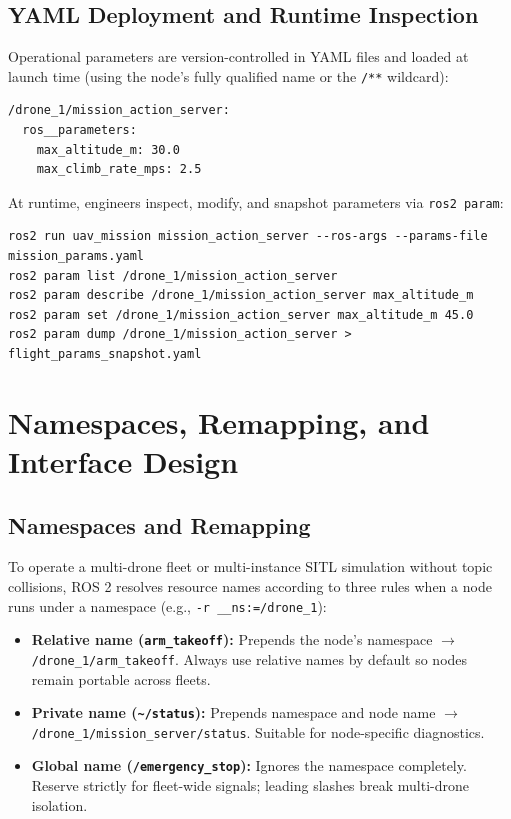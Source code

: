 \documentclass{article}
\begin{document}
\subsection{YAML Deployment and Runtime Inspection}
Operational parameters are version-controlled in YAML files and loaded at launch time (using the node's fully qualified name or the \texttt{/**} wildcard):

\begin{verbatim}
/drone_1/mission_action_server:
  ros__parameters:
    max_altitude_m: 30.0
    max_climb_rate_mps: 2.5
\end{verbatim}

At runtime, engineers inspect, modify, and snapshot parameters via \texttt{ros2 param}:
\begin{verbatim}
ros2 run uav_mission mission_action_server --ros-args --params-file mission_params.yaml
ros2 param list /drone_1/mission_action_server
ros2 param describe /drone_1/mission_action_server max_altitude_m
ros2 param set /drone_1/mission_action_server max_altitude_m 45.0
ros2 param dump /drone_1/mission_action_server > flight_params_snapshot.yaml
\end{verbatim}

\section{Namespaces, Remapping, and Interface Design}

\subsection{Namespaces and Remapping}
To operate a multi-drone fleet or multi-instance SITL simulation without topic collisions, ROS 2 resolves resource names according to three rules when a node runs under a namespace (e.g., \texttt{-r \_\_ns:=/drone\_1}):
\begin{itemize}
    \item \textbf{Relative name (\texttt{arm\_takeoff}):} Prepends the node's namespace $\rightarrow$ \texttt{/drone\_1/arm\_takeoff}. Always use relative names by default so nodes remain portable across fleets.
    \item \textbf{Private name (\texttt{\textasciitilde{}/status}):} Prepends namespace and node name $\rightarrow$ \texttt{/drone\_1/mission\_server/status}. Suitable for node-specific diagnostics.
    \item \textbf{Global name (\texttt{/emergency\_stop}):} Ignores the namespace completely. Reserve strictly for fleet-wide signals; leading slashes break multi-drone isolation.
\end{itemize}
\end{document}

